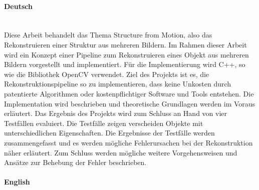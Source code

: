 
\paragraph{Deutsch}\mbox{}\\
Diese Arbeit behandelt das Thema Structure from Motion, also das Rekonstruieren einer Struktur aus mehreren Bildern.
Im Rahmen dieser Arbeit wird ein Konzept einer Pipeline zum Rekonstruieren eines Objekt aus mehreren Bildern vorgestellt und implementiert.
Für die Implementierung wird C++, so wie die Bibliothek OpenCV verwendet.
Ziel des Projekts ist es, die Rekonstruktionspipeline so zu implementieren, dass keine Unkosten durch patentierte Algorithmen oder kostenpflichtiger Software und Tools entstehen.
Die Implementation wird beschrieben und theoretische Grundlagen werden im Voraus erläutert. 
Das Ergebnis des Projekts wird zum Schluss an Hand von vier Testfällen evaluiert.
Die Testfälle zeigen verscheiden Objekte mit unterschiedlichen Eigenschaften.
Die Ergebnisse der Testfälle werden zusammengefasst und es werden mögliche Fehlerursachen bei der Rekonstruktion näher erläutert.
Zum Schluss werden mögliche weitere Vorgehensweisen und Ansätze zur Behebung der Fehler beschrieben. 

\paragraph{English}\mbox{}\\
